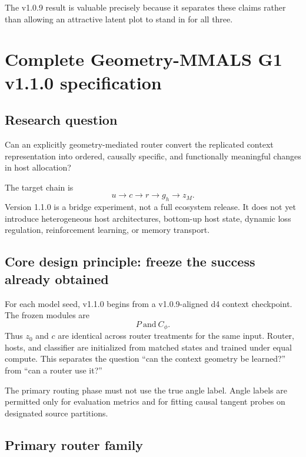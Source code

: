 \documentclass[11pt,a4paper]{article}
\begin{document}
The v1.0.9 result is valuable precisely because it separates these claims rather than allowing an attractive latent plot to stand in for all three.

\section{Complete Geometry-MMALS G1 v1.1.0 specification}

\subsection{Research question}

\begin{plainbox}
Can an explicitly geometry-mediated router convert the replicated context representation into ordered, causally specific, and functionally meaningful changes in host allocation?
\end{plainbox}

The target chain is
\begin{equation}
 u\longrightarrow c\longrightarrow r\longrightarrow g_h\longrightarrow z_M.
\end{equation}
Version 1.1.0 is a bridge experiment, not a full ecosystem release. It does not yet introduce heterogeneous host architectures, bottom-up host state, dynamic loss regulation, reinforcement learning, or memory transport.

\subsection{Core design principle: freeze the success already obtained}

For each model seed, v1.1.0 begins from a v1.0.9-aligned d4 context checkpoint. The frozen modules are
\begin{equation}
 P\ \text{and}\ C_\phi.
\end{equation}
Thus $z_0$ and $c$ are identical across router treatments for the same input. Router, hosts, and classifier are initialized from matched states and trained under equal compute. This separates the question ``can the context geometry be learned?'' from ``can a router use it?''

The primary routing phase must not use the true angle label. Angle labels are permitted only for evaluation metrics and for fitting causal tangent probes on designated source partitions.

\subsection{Primary router family}
\end{document}
